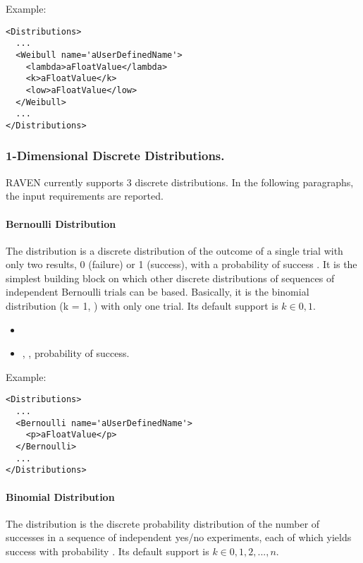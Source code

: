Example:
\begin{lstlisting}[style=XML]
<Distributions>
  ...
  <Weibull name='aUserDefinedName'>
    <lambda>aFloatValue</lambda>
    <k>aFloatValue</k>
    <low>aFloatValue</low>
  </Weibull>
  ...
</Distributions>
\end{lstlisting}

\subsubsection{1-Dimensional Discrete Distributions.}
\label{subsubsec:1DDiscrete}
RAVEN currently supports 3 discrete distributions.
%
In the following paragraphs, the input requirements are reported.

\paragraph{Bernoulli Distribution}
\label{Bernoulli}
The  distribution is a discrete distribution of the outcome
of a single trial with only two results, 0 (failure) or 1 (success), with a
probability of success .
%
It is the simplest building block on which other discrete distributions of
sequences of independent Bernoulli trials can be based.
%
Basically, it is the binomial distribution (k = 1, ) with only
one trial.
%
Its default support is $k \in {0, 1}$.

%
\attrIntro
\vspace{-5mm}
\begin{itemize}
  \itemsep0em
  \item \nameDescription
\end{itemize}
\vspace{-5mm}
\subnodeIntro
\begin{itemize}
  \item {}, , probability of
  success.
 \end{itemize}
Example:
\begin{lstlisting}[style=XML]
<Distributions>
  ...
  <Bernoulli name='aUserDefinedName'>
    <p>aFloatValue</p>
  </Bernoulli>
  ...
</Distributions>
\end{lstlisting}

\paragraph{Binomial Distribution}
\label{Binomial}
The  distribution is the discrete probability distribution of
the number of successes in a sequence of  independent yes/no
experiments, each of which yields success with probability .
%
Its default support is $k \in {0, 1, 2, ..., n}$.

